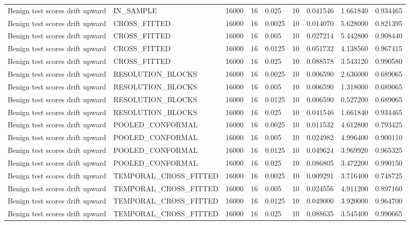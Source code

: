 \begin{tabular}{lllllllll}
Benign test scores drift upward & IN\_SAMPLE & 16000 & 16 & 0.025 & 10 & 0.041546 & 1.661840 & 0.934465 \\
Benign test scores drift upward & CROSS\_FITTED & 16000 & 16 & 0.0025 & 10 & 0.014070 & 5.628000 & 0.821395 \\
Benign test scores drift upward & CROSS\_FITTED & 16000 & 16 & 0.005 & 10 & 0.027214 & 5.442800 & 0.908440 \\
Benign test scores drift upward & CROSS\_FITTED & 16000 & 16 & 0.0125 & 10 & 0.051732 & 4.138560 & 0.967415 \\
Benign test scores drift upward & CROSS\_FITTED & 16000 & 16 & 0.025 & 10 & 0.088578 & 3.543120 & 0.990580 \\
Benign test scores drift upward & RESOLUTION\_BLOCKS & 16000 & 16 & 0.0025 & 10 & 0.006590 & 2.636000 & 0.689065 \\
Benign test scores drift upward & RESOLUTION\_BLOCKS & 16000 & 16 & 0.005 & 10 & 0.006590 & 1.318000 & 0.689065 \\
Benign test scores drift upward & RESOLUTION\_BLOCKS & 16000 & 16 & 0.0125 & 10 & 0.006590 & 0.527200 & 0.689065 \\
Benign test scores drift upward & RESOLUTION\_BLOCKS & 16000 & 16 & 0.025 & 10 & 0.041546 & 1.661840 & 0.934465 \\
Benign test scores drift upward & POOLED\_CONFORMAL & 16000 & 16 & 0.0025 & 10 & 0.011532 & 4.612800 & 0.793425 \\
Benign test scores drift upward & POOLED\_CONFORMAL & 16000 & 16 & 0.005 & 10 & 0.024982 & 4.996400 & 0.900110 \\
Benign test scores drift upward & POOLED\_CONFORMAL & 16000 & 16 & 0.0125 & 10 & 0.049624 & 3.969920 & 0.965325 \\
Benign test scores drift upward & POOLED\_CONFORMAL & 16000 & 16 & 0.025 & 10 & 0.086805 & 3.472200 & 0.990150 \\
Benign test scores drift upward & TEMPORAL\_CROSS\_FITTED & 16000 & 16 & 0.0025 & 10 & 0.009291 & 3.716400 & 0.748725 \\
Benign test scores drift upward & TEMPORAL\_CROSS\_FITTED & 16000 & 16 & 0.005 & 10 & 0.024556 & 4.911200 & 0.897160 \\
Benign test scores drift upward & TEMPORAL\_CROSS\_FITTED & 16000 & 16 & 0.0125 & 10 & 0.049000 & 3.920000 & 0.964700 \\
Benign test scores drift upward & TEMPORAL\_CROSS\_FITTED & 16000 & 16 & 0.025 & 10 & 0.088635 & 3.545400 & 0.990665 \\

\end{tabular}

